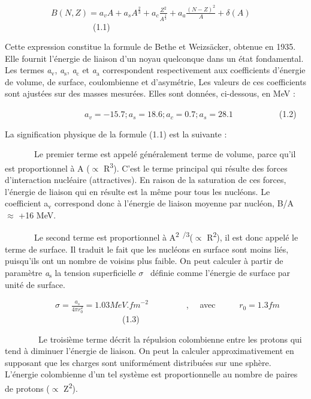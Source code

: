 \documentclass[a4paper]{article}
\providecommand\textsubscript[1]{\ensuremath{{}_{\text{#1}}}}
\begin{document}
\ \ \ \ \ \ \ \ \ \ \  $B\left(N,Z\right)=a_vA+a_sA^{\frac 2 3}+a_c\frac{Z^2}{A^{\frac 1 3}}+a_a\frac{(N-Z)^2} A+\delta
(A)$\ \ \ \ \ \ \ \ \ \ \ \ \ \ \ \ \ \ \ \ \ (1.1)

Cette expression constitue la formule de Bethe et Weizsäcker, obtenue en 1935. Elle fournit l’énergie de liaison d’un
noyau quelconque dans un état fondamental. Les termes \textit{a}\textit{\textsubscript{v}},
\textit{a}\textit{\textsubscript{s}}, \textit{a}\textit{\textsubscript{c}} et \textit{a}\textit{\textsubscript{a}}
correspondent respectivement aux coefficients d’énergie de volume, de surface, coulombienne et d’asymétrie, Les valeurs
de ces coefficients sont ajustées sur des masses mesurées. Elles sont données, ci-dessous, en MeV :

\ \ \ \ \ \ \ \ \ \ \ \ \ \ \ \ \ \ \  $a_v=-15.7;a_s=18.6;a_c=0.7;a_s=28.1$\ \ \ \ \ \ \ \ \ \ \ (1.2)

La signification physique de la formule (1.1) est la suivante :

\ \ \ \ \ \ \ Le premier terme est appelé généralement terme de volume, parce qu'il est proportionnel à A (${\propto}$
R\textsuperscript{3}). C’est le terme principal qui résulte des forces d’interaction nucléaire (attractives). En raison
de la saturation de ces forces, l’énergie de liaison qui en résulte est la même pour tous les nucléons. Le coefficient
a\textsubscript{v} correspond donc à l’énergie de liaison moyenne par nucléon, B/A ${\approx}$ +16 MeV.

\ \ \ \ \ \ \ Le second terme est proportionnel à A\textsuperscript{2~/3}(${\propto}$ R\textsuperscript{2}), il est donc
appelé le terme de surface. Il traduit le fait que les nucléons en surface sont moins liés, puisqu’ils ont un nombre de
voisins plus faible. On peut calculer à partir de paramètre \textit{a}\textit{\textsubscript{s}} la tension
superficielle  $\sigma $ \ définie comme l'énergie de surface par unité de surface.

\ \ \ \ \ \ \ \ \ \ \ \  $\sigma =\frac{a_s}{4\pi r_0^2}=1.03\mathit{MeV.}\mathit{fm}^{-2}$\ \ \ \ \ \ \ \ \ , \ \ avec
\ \ \ \ \  $r_0=1.3\mathit{fm}$\ \ \ \ \ \ \ \ \ \ \ \ \ \ \ \ \ \ \ \ \ \ \ \ \ \ \ \ (1.3)


\bigskip

\ \ \ \ \ \ \ \ Le troisième terme décrit la répulsion colombienne entre les protons qui tend à diminuer l’énergie de
liaison. On peut la calculer approximativement en supposant que les charges sont uniformément distribuées sur une
sphère. L'énergie colombienne d'un tel système est proportionnelle au nombre de paires de protons (${\propto}$
Z\textsuperscript{2}).
\end{document}
